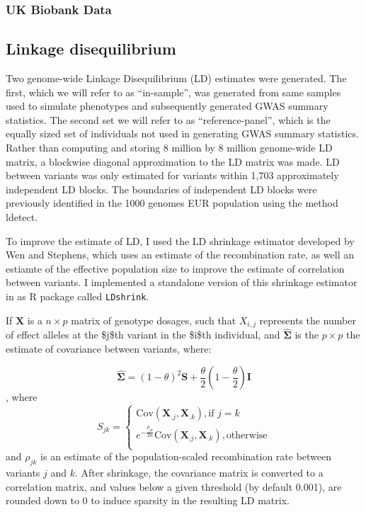 \subsubsection{UK Biobank Data}\label{sec:org642e65e}


\subsection{Linkage disequilibrium}\label{sec:org828aaeb}

Two genome-wide Linkage Disequilibrium (LD) estimates were generated.  The first, which we will refer to as ``in-sample'', was generated from same samples used to simulate phenotypes and subsequently generated GWAS summary statistics.  The second set we will refer to as ``reference-panel'', which is the equally sized set of individuals not used in generating GWAS summary statistics.  Rather than computing and storing 8 million by 8 million genome-wide LD matrix, a blockwise diagonal approximation to the LD matrix was made.  LD between variants was only estimated for variants within 1,703 approximately independent LD blocks.  The boundaries of independent LD blocks were previously identified in the 1000 genomes EUR population using the method ldetect\cite{ldetect}.  

To improve the estimate of LD, I used the LD shrinkage estimator developed by Wen and Stephens\cite{Wen_2010}, which uses an estimate of 
the recombination rate, as well an estiamte of the effective population size to improve the estimate of correlation between variants.
I implemented a standalone version of this shrinkage estimator in as R package called \texttt{LDshrink}.

If \(\boldsymbol{X}\) is a \(n \times p\) matrix of genotype dosages, such that \(X_{i,j}\) represents the number of effect alleles at the \$j\$th variant in the \$i\$th individual, and \(\hat{\boldsymbol{\Sigma}}\) is the \(p \times p\)  the estimate of covariance between
variants, where:

\[\boldsymbol{\hat{\Sigma}} = (1-\theta)^2 \textbf{S}+\frac{\theta}{2} \left(1-\frac{\theta}{2}\right)\textbf{I}\],
where 
$$ S_{jk} = \begin{cases}
\text{Cov}(\boldsymbol{X}_{.j},\boldsymbol{X}_{.k}), \text{if } j=k \\
e^{-\frac{\rho_{jk}}{2n}}\text{Cov}(\boldsymbol{X}_{.j},\boldsymbol{X}_{.k}), \text{otherwise}\\
\end{cases} $$
and \(\rho_{jk}\) is an estimate of the population-scaled recombination rate between variants \(j\) and \(k\). After shrinkage, the covariance matrix is converted to a correlation matrix, and values below a given threshold (by default 0.001), are rounded down to 0 to induce sparsity in the resulting LD matrix.

